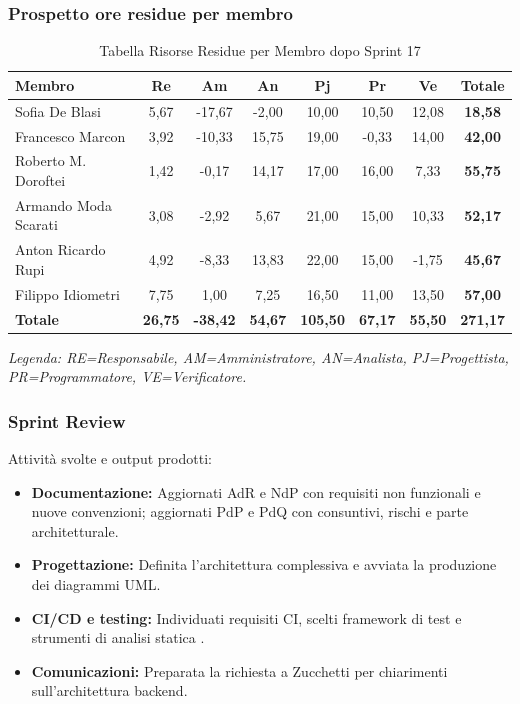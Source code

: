 \subsubsection{Prospetto ore residue per membro}
\begin{table}[H]
    \centering
    \renewcommand{\arraystretch}{1.3}
    \begin{tabularx}{\textwidth}{|X|c|c|c|c|c|c|c|}
        \hline
        \textbf{Membro} & \textbf{Re} & \textbf{Am} & \textbf{An} &
        \textbf{Pj} & \textbf{Pr} & \textbf{Ve} & \textbf{Totale} \\
        \hline
        Sofia De Blasi       &  5,67 & -17,67 &  -2,00 & 10,00 & 10,50 & 12,08 & \textbf{18,58} \\
        Francesco Marcon     &  3,92 &  -10,33 & 15,75 & 19,00 &  -0,33 & 14,00 & \textbf{42,00} \\
        Roberto M. Doroftei  &  1,42 &  -0,17 & 14,17 & 17,00 & 16,00 &  7,33 & \textbf{55,75} \\
        Armando Moda Scarati &  3,08 &  -2,92 &  5,67 & 21,00 & 15,00 & 10,33 & \textbf{52,17} \\
        Anton Ricardo Rupi   &  4,92 &  -8,33 & 13,83 & 22,00 & 15,00 &  -1,75 & \textbf{45,67} \\
        Filippo Idiometri    &  7,75 &   1,00 &  7,25 & 16,50 & 11,00 & 13,50 & \textbf{57,00} \\
        \hline
        \textbf{Totale} &
        \textbf{26,75} & \textbf{-38,42} & \textbf{54,67} &
        \textbf{105,50} & \textbf{67,17} & \textbf{55,50} &
        \textbf{271,17} \\
        \hline
    \end{tabularx}
    \begin{minipage}{\textwidth}
        \smallskip
        \footnotesize\textit{Legenda: RE=Responsabile, AM=Amministratore,
        AN=Analista, PJ=Progettista, PR=Programmatore, VE=Verificatore.}
    \end{minipage}
    \caption{Tabella Risorse Residue per Membro dopo Sprint 17}
\end{table}

\subsubsection{Sprint Review}
Attività svolte e output prodotti:
\begin{itemize}
    \item \textbf{Documentazione:} Aggiornati AdR e NdP con requisiti non funzionali e nuove convenzioni; aggiornati PdP e PdQ con consuntivi, rischi e parte architetturale.
    \item \textbf{Progettazione:} Definita l’architettura complessiva e avviata la produzione dei diagrammi UML.
    \item \textbf{CI/CD e testing:} Individuati requisiti CI, scelti framework di test e strumenti di analisi statica .
    \item \textbf{Comunicazioni:} Preparata la richiesta a Zucchetti per chiarimenti sull’architettura backend.
\end{itemize}

